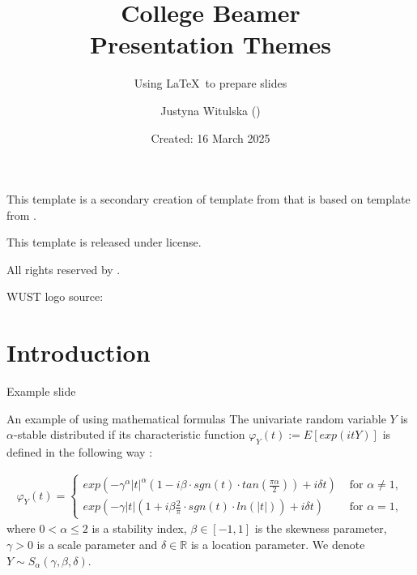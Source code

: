 \documentclass{beamer}
\title{College Beamer\\ Presentation Themes}
\subtitle{Using \LaTeX\ to prepare slides}
\author{Justyna Witulska (\bhref{https://pwr.edu.pl/en/}{WUST})}
\date{Created: 16 March 2025}
\begin{document}
\maketitle

\begin{frame}
    This template is a secondary creation of 
     template from  that is based on 
     template from . \vspace{\baselineskip}

    This template is released under  license. \vspace{\baselineskip}

    All rights reserved by .\vspace{\baselineskip}


    WUST logo source: 
    
\end{frame}

\section{Introduction}

\begin{frame}{Example slide}
    \lipsum[1]
\end{frame}

\begin{frame}{An example of using mathematical formulas}
    The univariate random variable $Y$ is $\alpha$-stable distributed if its characteristic function $\varphi_Y(t):=E[exp(itY)]$ is defined in the following way \cite{nolan2021stable}:
    
    \begin{align}
    \varphi_Y(t) = \begin{cases}
    exp(-\gamma^{\alpha}|t|^{\alpha} \left( 1 - i\beta \cdot sgn(t) \cdot tan\left(\frac{\pi \alpha}{2}\right) \right) + i\delta t) &\text{  for  } \alpha \neq 1, \\
    exp(-\gamma|t| \left( 1 + i\beta \frac{2}{\pi} \cdot sgn(t) \cdot ln(|t|) \right) + i\delta t) &\text{  for  } \alpha = 1,
    \end{cases}
    \end{align}
    where $0<\alpha\leq 2$ is a stability index, $\beta \in [-1,1]$ is the skewness parameter, $\gamma>0$ is a scale parameter and $\delta \in \mathbb{R}$ is a location parameter. We denote $Y \sim S_{\alpha}(\gamma, \beta, \delta).$
\end{frame}
\end{document}
